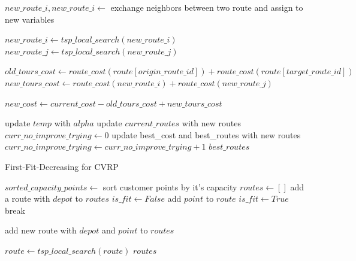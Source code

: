 \documentclass[12pt]{article}
\begin{document}
\begin{algorithm}[!h]
\begin{algorithmic}[1]
            \State $new\_route\_i, new\_route\_i \gets$ exchange neighbors between two route and assign to new variables

            \State $new\_route\_i \gets tsp\_local\_search(new\_route\_i)$  
            \State $new\_route\_j \gets tsp\_local\_search(new\_route\_j)$

            \State $old\_tours\_cost \gets route\_cost(route[origin\_route\_id]) + route\_cost(route[target\_route\_id])$
            \State $new\_tours\_cost \gets route\_cost(new\_route\_i) + route\_cost(new\_route\_j)$

            \State $new\_cost \gets current\_cost - old\_tours\_cost + new\_tours\_cost$
            
                \State update $temp$ with $alpha$
                \State update $current\_routes$ with new routes
                \State $curr\_no\_improve\_trying \gets 0$
                    \State update best\_cost and best\_routes with new routes
                \EndIf
            \Else
                \State $curr\_no\_improve\_trying \gets curr\_no\_improve\_trying + 1$
            \EndIf
        \EndWhile
        \Return $best\_routes$
	\EndFunction
	\end{algorithmic}
\end{algorithm}


\begin{algorithm}[!h]
	\caption{First-Fit-Decreasing for CVRP}
	\label{alg:alg_ffd}
	
    \begin{algorithmic}[1]
    
        \State $sorted\_capacity\_points \gets$ sort customer points by it's capacity
        \State $routes \gets []$
        \State add a route with $depot$ to $routes$
        \State $is\_fit \gets False$
                \State add $point$ to $route$
                \State $is\_fit \gets True$
                \State break
            \EndIf
            \EndFor

                \State add new route with $depot$ and $point$ to $routes$
            \EndIf
        \EndFor

            \State $route \gets tsp\_local\_search(route)$
        \EndFor
        \Return $routes$
	\EndFunction
	\end{algorithmic}
\end{algorithm}
\end{document}
